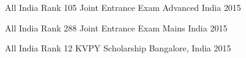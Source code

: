 \begin{cvhonors}

  \cvhonor
  {All India Rank 105}
  {Joint Entrance Exam Advanced}
  {India}
  {2015}

  \cvhonor
  {All India Rank 288}
  {Joint Entrance Exam Mains}
  {India}
  {2015}

  \cvhonor
  {All India Rank 12}
  {KVPY Scholarship}
  {Bangalore, India}
  {2015}

\end{cvhonors}

